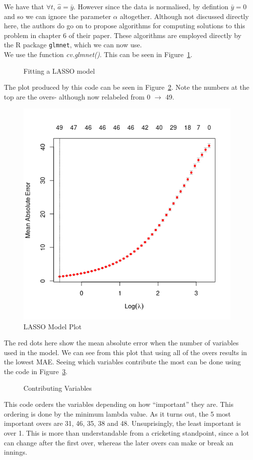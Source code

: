 We have that $\forall t$, $\hat{a} = \bar{y}$. However since the data is normalised, by defintion $\bar{y}=0$ and so we can ignore the parameter $\alpha$ altogether. Although not discussed directly here, the authors do go on to propose algorithms for computing solutions to this problem in chapter 6 of their paper. These algorithms are employed directly by the R package \verb|glmnet|, which we can now use. \\

We use the function \textit{cv.glmnet()}. This can be seen in Figure~\ref{lassoCode}.

\begin{figure}[h]
    
    \caption{Fitting a LASSO model}
    \label{lassoCode}
\end{figure}

The plot produced by this code can be seen in Figure~\ref{lassoFig}. Note the numbers at the top are the overs- although now relabeled from 0 $\to$ 49. 

\begin{figure}[h]
    \centering
    \includegraphics[width=0.5\linewidth]{figures/lasso.png}
    \caption{LASSO Model Plot}
    \label{lassoFig}
\end{figure}

The red dots here show the mean absolute error when the number of variables used in the model. We can see from this plot that using all of the overs results in the lowest MAE. Seeing which variables contribute the most can be done using the code in Figure~\ref{lassoVals}. 

\begin{figure}[h]
    
    \caption{Contributing Variables}
    \label{lassoVals}
\end{figure}

This code orders the variables depending on how ``important'' they are. This ordering is done by the minimum lambda value. As it turns out, the 5 most important overs are 31, 46, 35, 38 and 48. Unsuprisingly, the least important is over 1. This is more than understandable from a cricketing standpoint, since a lot can change after the first over, whereas the later overs can make or break an innings. 

